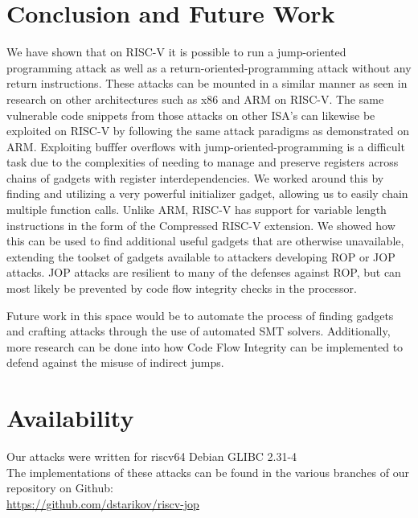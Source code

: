 \section{Conclusion and Future Work}
We have shown that on RISC-V it is possible to run a jump-oriented programming
attack as well as a return-oriented-programming attack without any return
instructions. These attacks can be mounted in a similar manner as seen in
research on other architectures such as x86 and ARM on RISC-V. The same vulnerable
code snippets from those attacks on other ISA's can likewise be exploited on RISC-V
by following the same attack paradigms as demonstrated on ARM. Exploiting bufffer
overflows with jump-oriented-programming is a difficult task due to the complexities
of needing to manage and preserve registers across chains of gadgets with register
interdependencies. We worked around this by finding and utilizing a very powerful
initializer gadget, allowing us to easily chain multiple function calls. Unlike ARM,
RISC-V has support for variable length instructions in the form of the Compressed
RISC-V extension. We showed how this can be used to find additional useful gadgets
that are otherwise unavailable, extending the toolset of gadgets available to
attackers developing ROP or JOP attacks. JOP attacks are resilient to many of
the defenses against ROP, but can most likely be prevented by code flow integrity
checks in the processor.

Future work in this space would be to automate the process of finding gadgets and
crafting attacks through the use of automated SMT solvers. Additionally, more
research can be done into how Code Flow Integrity can be implemented to defend against
the misuse of indirect jumps.



\section*{Availability}
Our attacks were written for riscv64 Debian GLIBC 2.31-4\\
The implementations of these attacks can be found in the various branches of our
repository on Github:\\
\url{https://github.com/dstarikov/riscv-jop}


